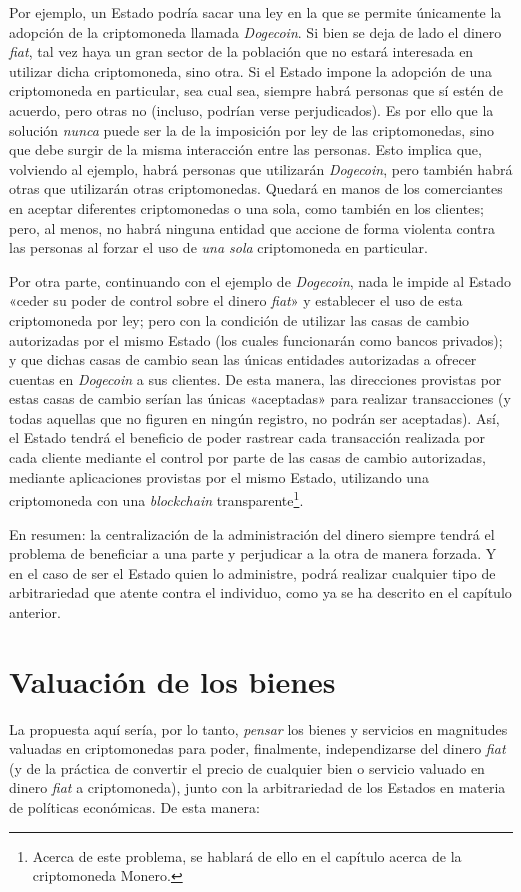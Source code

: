 \documentclass[12pt,a4paper,twoside]{book}
\begin{document}
Por ejemplo, un Estado podría sacar una ley en la que se permite únicamente la adopción de la criptomoneda llamada \textit{Dogecoin}. Si bien se deja de lado el dinero \textit{fiat}, tal vez haya un gran sector de la población que no estará interesada en utilizar dicha criptomoneda, sino otra. Si el Estado impone la adopción de una criptomoneda en particular, sea cual sea, siempre habrá personas que sí estén de acuerdo, pero otras no (incluso, podrían verse perjudicados). Es por ello que la solución \textit{nunca} puede ser la de la imposición por ley de las criptomonedas, sino que debe surgir de la misma interacción entre las personas. Esto implica que, volviendo al ejemplo, habrá personas que utilizarán \textit{Dogecoin}, pero también habrá otras que utilizarán otras criptomonedas. Quedará en manos de los comerciantes en aceptar diferentes criptomonedas o una sola, como también en los clientes; pero, al menos, no habrá ninguna entidad que accione de forma violenta contra las personas al forzar el uso de \textit{una sola} criptomoneda en particular.

Por otra parte, continuando con el ejemplo de \textit{Dogecoin}, nada le impide al Estado «ceder su poder de control sobre el dinero \textit{fiat}» y establecer el uso de esta criptomoneda por ley; pero con la condición de utilizar las casas de cambio autorizadas por el mismo Estado (los cuales funcionarán como bancos privados); y que dichas casas de cambio sean las únicas entidades autorizadas a ofrecer cuentas en \textit{Dogecoin} a sus clientes. De esta manera, las direcciones provistas por estas casas de cambio serían las únicas «aceptadas» para realizar transacciones (y todas aquellas que no figuren en ningún registro, no podrán ser aceptadas). Así, el Estado tendrá el beneficio de poder rastrear cada transacción realizada por cada cliente mediante el control por parte de las casas de cambio autorizadas, mediante aplicaciones provistas por el mismo Estado, utilizando una criptomoneda con una \textit{blockchain} transparente\footnote{Acerca de este problema, se hablará de ello en el capítulo acerca de la criptomoneda Monero.}.

En resumen: la centralización de la administración del dinero siempre tendrá el problema de beneficiar a una parte y perjudicar a la otra de manera forzada. Y en el caso de ser el Estado quien lo administre, podrá realizar cualquier tipo de arbitrariedad que atente contra el individuo, como ya se ha descrito en el capítulo anterior.

\section{Valuación de los bienes}
La propuesta aquí sería, por lo tanto, \textit{pensar} los bienes y servicios en magnitudes valuadas en criptomonedas para poder, finalmente, independizarse del dinero \textit{fiat} (y de la práctica de convertir el precio de cualquier bien o servicio valuado en dinero \textit{fiat} a criptomoneda), junto con la arbitrariedad de los Estados en materia de políticas económicas.  De esta manera:
\end{document}

